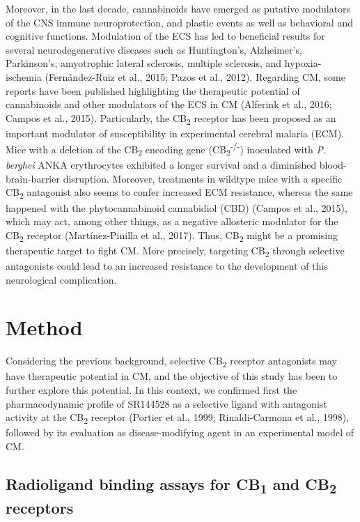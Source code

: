 \documentclass[empirical, authordate, issue]{jote-new-article}
\begin{document}
Moreover, in the last decade, cannabinoids have emerged as putative modulators of the CNS immune neuroprotection, and plastic events as well as behavioral and cognitive functions. Modulation of the ECS has led to beneficial results for several neurodegenerative diseases such as Huntington's, Alzheimer's, Parkinson's, amyotrophic lateral sclerosis, multiple sclerosis, and hypoxia-ischemia (Fernández-Ruiz et al., 2015; Pazos et al., 2012). Regarding CM, some reports have been published highlighting the therapeutic potential of cannabinoids and other modulators of the ECS in CM (Alferink et al., 2016; Campos et al., 2015). Particularly, the CB\textsubscript{2} receptor has been proposed as an important modulator of susceptibility in experimental cerebral malaria (ECM). Mice with a deletion of the CB\textsubscript{2} encoding gene (CB\textsubscript{2}\textsuperscript{-/-}) inoculated with \emph{P. berghei }ANKA erythrocytes exhibited a longer survival and a diminished blood-brain-barrier disruption. Moreover, treatments in wildtype mice with a specific CB\textsubscript{2 }antagonist also seems to confer increased ECM resistance, whereas the same happened with the phytocannabinoid cannabidiol (CBD) (Campos et al., 2015), which may act, among other things, as a negative allosteric modulator for the CB\textsubscript{2} receptor (Martínez-Pinilla et al., 2017). Thus, CB\textsubscript{2} might be a promising therapeutic target to fight CM. More precisely, targeting CB\textsubscript{2} through selective antagonists could lead to an increased resistance to the development of this neurological complication.

\section{Method}

Considering the previous background, selective CB\textsubscript{2 }receptor antagonists may have therapeutic potential in CM, and the objective of this study has been to further explore this potential. In this context, we confirmed first the pharmacodynamic profile of SR144528 as a selective ligand with antagonist activity at the CB\textsubscript{2} receptor (Portier et al., 1999; Rinaldi-Carmona et al., 1998), followed by its evaluation as disease-modifying agent in an experimental model of CM.

\subsection{Radioligand binding assays for CB\textsubscript{1} and CB\textsubscript{2} receptors}
\end{document}
